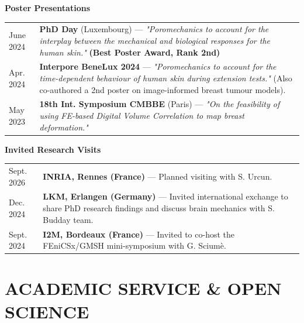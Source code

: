 \documentclass[10pt, a4paper]{article}
\begin{document}
\vspace{4pt}\noindent\textbf{Poster Presentations}

\noindent
\begin{tabularx}{\linewidth}{lX}
  June 2024 & \textbf{PhD Day} (Luxembourg) — \textit{"Poromechanics to account for the interplay between the mechanical and biological responses for the human skin."} \textbf{(Best Poster Award, Rank 2nd)} \\
  Apr. 2024 & \textbf{Interpore BeneLux 2024} — \textit{"Poromechanics to account for the time-dependent behaviour of human skin during extension tests."} (Also co-authored a 2nd poster on image-informed breast tumour models). \\
  May 2023 & \textbf{18th Int. Symposium CMBBE} (Paris) — \textit{"On the feasibility of using FE-based Digital Volume Correlation to map breast deformation."} \\
\end{tabularx}

\vspace{4pt}\noindent\textbf{Invited Research Visits}

\noindent
\begin{tabularx}{\linewidth}{lX}
  Sept. 2026 & \textbf{INRIA, Rennes (France)} — Planned visiting with S. Urcun. \\
  Dec. 2024 & \textbf{LKM, Erlangen (Germany)} — Invited international exchange to share PhD research findings and discuss brain mechanics with S. Budday team. \\
  Sept. 2024 & \textbf{I2M, Bordeaux (France)} — Invited to co-host the FEniCSx/GMSH mini-symposium with G. Sciumè. \\
\end{tabularx}


\section{ACADEMIC SERVICE \& OPEN SCIENCE}
\end{document}
